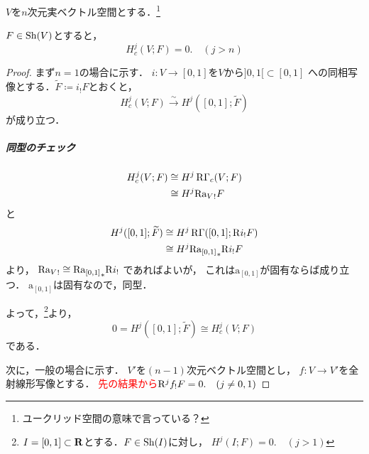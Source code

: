 \(V\)を\(n\)次元実ベクトル空間とする．\footnote{ユークリッド空間の意味で言っている？}
\begin{LMM}
    \(F\in\mathrm{Sh}(V)\)とすると，
    \[H^j_c(V;F)=0.\quad(j>n)\]
\end{LMM}
\begin{proof}
    まず\(n=1\)の場合に示す．
    \(i\colon V\to [0,1]\)を\(V\)から\({]0,1[}\subset [0,1]\)
    への同相写像とする．\(\widetilde{F}\coloneqq i_!F\)とおくと，
    \[
        H^j_c(V;F)
        \overset{\sim}{\longrightarrow}
        H^j([0,1];\widetilde{F})
    \]
    が成り立つ．
    \begin{center}
        \begin{minipage}{.9\textwidth}
        \begin{redleftbar}
            \subparagraph*{同型のチェック}
            \begin{align*}
                H^j_c(V;F)
                &\cong H^j\mathop{\mathrm{R}\hspace{-0pt}\Gamma}\nolimits_c(V;F)\\        
                &\cong H^j{\mathrm{R}\mathrm{a}_V}_!F        
            \end{align*}
            と
            \begin{align*}
                H^j([0,1];\widetilde{F})
                &\cong H^j\mathop{\mathrm{R}\hspace{-0pt}\Gamma}\nolimits([0,1];\mathrm{R}{i}_!F)\\        
                &\cong H^j{\mathrm{R}\mathrm{a}_{[0,1]}}_\ast\mathrm{R}{i}_!F        
            \end{align*}
            より，
            \(
                {\mathrm{R}\mathrm{a}_V}_!
                \cong
                {\mathrm{R}\mathrm{a}_{[0,1]}}_\ast\mathrm{R}{i}_!
            \)
            であればよいが，
            これは\(\mathrm{a}_{[0,1]}\)が固有ならば成り立つ．
            \(\mathrm{a}_{[0,1]}\)は固有なので，同型．
        \end{redleftbar}
        \end{minipage}
    \end{center}
    よって，\cite[Proposition 2.7.3 (i)]{KS90}\footnote{
        \(I=[0,1]\subset\mathbf{R}\)とする．\(F\in\mathrm{Sh}(I)\)に対し，
        \(H^j(I;F)=0.\quad(j>1)\)
    }より，
    \[
        0=H^j([0,1];\widetilde{F})
        \cong H^j_c(V;F)
    \]
    である．

    次に，一般の場合に示す．
    \(V'\)を\((n-1)\)次元ベクトル空間とし，
    \(f\colon V\to V'\)を全射線形写像とする．
    \textcolor{red}{先の結果から\(\mathrm{R}^jf_!F=0.\quad (j\ne0,1)\)}
    

\end{proof}
